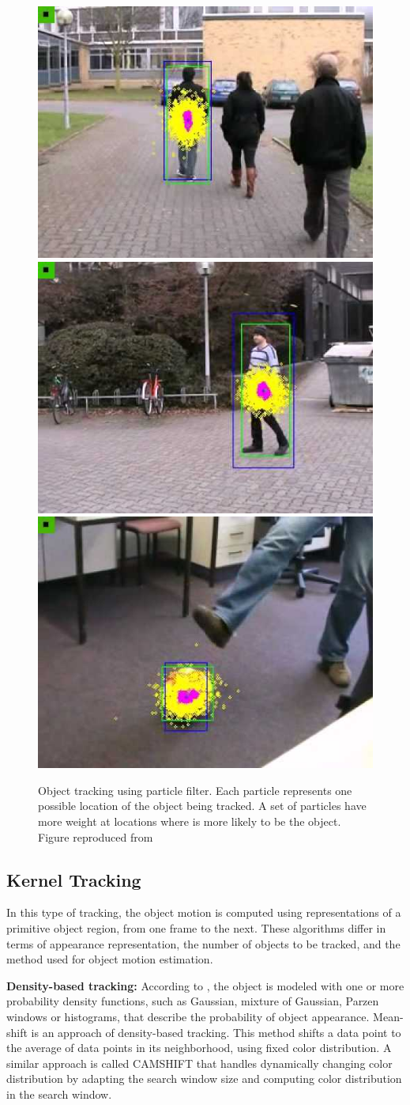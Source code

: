 \begin{figure}[t!!]
\centering
{
\includegraphics[width=0.32\linewidth]{Figures/particle_filter1.jpg}
\includegraphics[width=0.32\linewidth]{Figures/particle_filter2.jpg}
\includegraphics[width=0.32\linewidth]{Figures/particle_filter3.jpg}
}
\caption[Object tracking using particle filter]
		{Object tracking using particle filter. Each particle represents one
		possible location of the object being tracked. A set of particles have
		more weight at locations where is more likely to be the object. Figure
		reproduced from \cite{Rittscher2000}}
\end{figure}


\subsection{Kernel Tracking}

In this type of tracking, the object motion is computed using representations
of a primitive object region, from one frame to the next. These algorithms
differ in terms of appearance representation, the number of objects to be
tracked, and the method used for object motion estimation. 

\textbf{Density-based tracking:} According to \cite{Cheng1995}, the object is
modeled with one or more probability density functions, such as
Gaussian, mixture of Gaussian, Parzen windows or histograms, that describe
the probability of object appearance. Mean-shift is an approach of density-based
tracking. This method shifts a data point to the average of data points
in its neighborhood, using fixed color distribution. A similar
approach is called CAMSHIFT \cite{Exner2010} that handles dynamically
changing color distribution by adapting the search window size
and computing color distribution in the search window.

